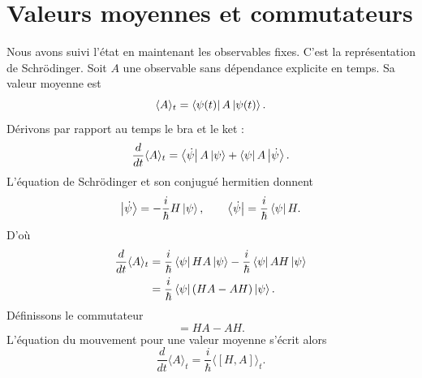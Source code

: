 \begin{classroomqa}
\end{classroomqa}

\section{Valeurs moyennes et commutateurs}

Nous avons suivi l’état en maintenant les observables fixes. C’est la représentation de Schr\"odinger. Soit \(A\) une observable sans dépendance explicite en temps. Sa valeur moyenne est
\begin{equation}
\langle A\rangle_t
=
\left\langle\psi(t)\right\rvert A\left\lvert\psi(t)\right\rangle.
\end{equation}
Dérivons par rapport au temps le bra et le ket :
\begin{equation}
\frac{d}{dt}\langle A\rangle_t
=
\left\langle\dot\psi\right\rvert A\left\lvert\psi\right\rangle
+
\left\langle\psi\right\rvert A\left\lvert\dot\psi\right\rangle.
\end{equation}
L’équation de Schr\"odinger et son conjugué hermitien donnent
\begin{equation}
\left\lvert\dot\psi\right\rangle
=-\frac{i}{\hbar}H\left\lvert\psi\right\rangle,
\qquad
\left\langle\dot\psi\right\rvert
=\frac{i}{\hbar}\left\langle\psi\right\rvert H.
\end{equation}
D’où
\begin{align}
\frac{d}{dt}\langle A\rangle_t
&=
\frac{i}{\hbar}\left\langle\psi\right\rvert HA\left\lvert\psi\right\rangle
-\frac{i}{\hbar}\left\langle\psi\right\rvert AH\left\lvert\psi\right\rangle \\
&=
\frac{i}{\hbar}\left\langle\psi\right\rvert(HA-AH)\left\lvert\psi\right\rangle.
\end{align}
Définissons le commutateur
\begin{equation}
[H,A]=HA-AH.
\end{equation}
L’équation du mouvement pour une valeur moyenne s’écrit alors
\begin{equation}
\boxed{
\frac{d}{dt}\langle A\rangle_t
=
\frac{i}{\hbar}\langle[H,A]\rangle_t
}.
\end{equation}

